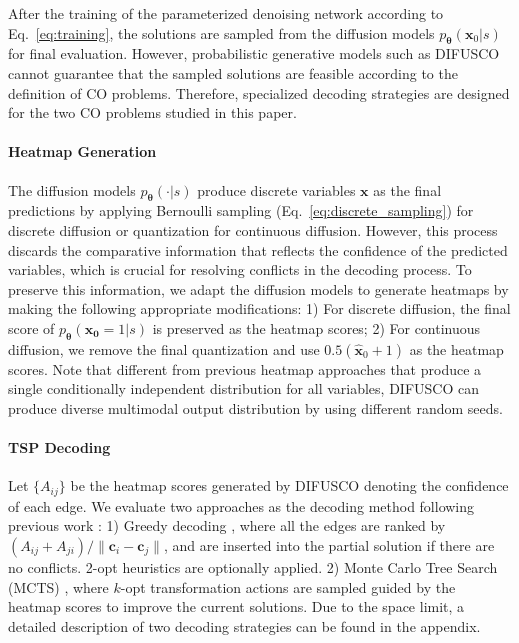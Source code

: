 \documentclass{article}
\theoremstyle{plain}
\theoremstyle{definition}
\theoremstyle{remark}
\newcommand{\method}{DIFUSCO}
\begin{document}
After the training of the parameterized denoising network according to Eq.~\ref{eq:training}, the solutions are sampled from the diffusion models $p_{\boldsymbol{\theta}}(\mathbf{x}_0 | s)$ for final evaluation. However, probabilistic generative models such as \method{} cannot guarantee that the sampled solutions are feasible according to the definition of CO problems. Therefore, specialized decoding strategies are designed for the two CO problems studied in this paper.

\paragraph{Heatmap Generation}

The diffusion models $p_{\boldsymbol{\theta}}(\cdot | s)$ produce discrete variables $\mathbf{x}$ as the final predictions by applying Bernoulli sampling (Eq.~\ref{eq:discrete_sampling}) for discrete diffusion or quantization for continuous diffusion. However, this process discards the comparative information that reflects the confidence of the predicted variables, which is crucial for resolving conflicts in the decoding process. To preserve this information, we adapt the diffusion models to generate heatmaps \citep{joshi2019efficient,qiudimes} by making the following appropriate modifications:
1) For discrete diffusion, the final score of $p_{\boldsymbol{\theta}}(\mathbf{x_0} = 1 | s)$ is preserved as the heatmap scores;
2) For continuous diffusion, we remove the final quantization and use $0.5 (\hat{\mathbf{x}}_0 + 1)$ as the heatmap scores.
Note that different from previous heatmap approaches \citep{joshi2019efficient,qiudimes} that produce a single conditionally independent distribution for all variables, \method{}  can produce diverse multimodal output distribution by using different random seeds.

\paragraph{TSP Decoding}
Let $\{A_{ij}\}$ be the heatmap scores generated by \method{} denoting the confidence of each edge.
We evaluate two approaches as the decoding method following previous work \citep{graikos2022diffusion,qiudimes}: 1) Greedy decoding \citep{graikos2022diffusion}, where all the edges are ranked by $(A_{ij} + A_{ji}) / \|\mathbf{c}_i - \mathbf{c}_j\|$, and are inserted into the partial solution if there are no conflicts. 2-opt heuristics \citep{lin1973effective} are optionally applied. 2) Monte Carlo Tree Search (MCTS) \citep{fu2021generalize}, where $k$-opt transformation actions are sampled guided by the heatmap scores to improve the current solutions.
Due to the space limit, a detailed description of two decoding strategies can be found
in the appendix.
\end{document}
